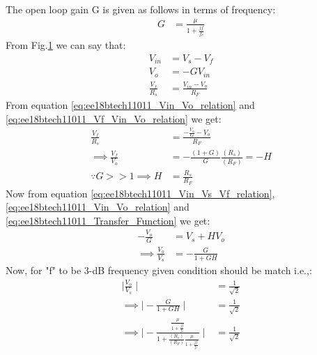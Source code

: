 \begin{enumerate}[label=\thesection.\arabic*.,ref=\thesection.\theenumi]
%
\begin{figure}[!ht]
	\begin{center}
			\resizebox{\columnwidth}{!}{}
	\end{center}
\caption{}
\label{fig:ee18btech11011_Inverting_configuration}
\end{figure}
%
The open loop gain G is given as follows in terms of frequency:
\begin{align}
    G &= \frac{\mu}{1 + \frac{jf}{f_{c}}}
\end{align}
From Fig.\ref{fig:ee18btech11011_Inverting_configuration} we can say that:
\begin{align}
    V_{i n} &= V_{s} - V_{f}
    \label{eq:ee18btech11011_Vin_Vs_Vf_relation}
    \\
    V_{o} &= -GV_{i n}
    \label{eq:ee18btech11011_Vin_Vo_relation}
    \\
    \frac{V_{f}}{R_{s}} &= \frac{V_{i n} - V_{o}}{R_{F}}
    \label{eq:ee18btech11011_Vf_Vin_Vo_relation}
\end{align}
From equation \ref{eq:ee18btech11011_Vin_Vo_relation} and \ref{eq:ee18btech11011_Vf_Vin_Vo_relation} we get:
\begin{align}
    \frac{V_{f}}{R_{s}} &= \frac{-\frac{V_{o}}{G} - V_{o}}{R_{F}}
    \\
    \implies \frac{V_{f}}{V_{o}} &= -\frac{(1 + G)}{G}\frac{(R_{s})}{(R_{F})} = -H
    \label{eq:ee18btech11011_Transfer_Function}
    \\
    \because G>>1 \implies H &= \frac{R_{s}}{R_{F}}
\end{align}
Now from equation \ref{eq:ee18btech11011_Vin_Vs_Vf_relation}, \ref{eq:ee18btech11011_Vin_Vo_relation} and \ref{eq:ee18btech11011_Transfer_Function} we get:
\begin{align}
    -\frac{V_{o}}{G} &= V_{s} + HV_{o}
    \\
    \implies \frac{V_{o}}{V_{s}} &= -\frac{G}{1 + GH}
\end{align}
Now, for "f" to be 3-dB frequency given condition should be match i.e.,:
\begin{align}
    \mid\frac{V_{o}}{V_{s}}\mid &= \frac{1}{\sqrt{2}}
    \\
    \implies \mid-\frac{G}{1 + GH}\mid &= \frac{1}{\sqrt{2}}
    \\
    \implies \mid-\frac{\frac{\mu}{1 + \frac{jf}{f_{c}}}}{1 + \frac{(R_{s})}{(R_{F})}\frac{\mu}{1 + \frac{jf}{f_{c}}}}\mid &= \frac{1}{\sqrt{2}}
\end{align}

\end{enumerate}
